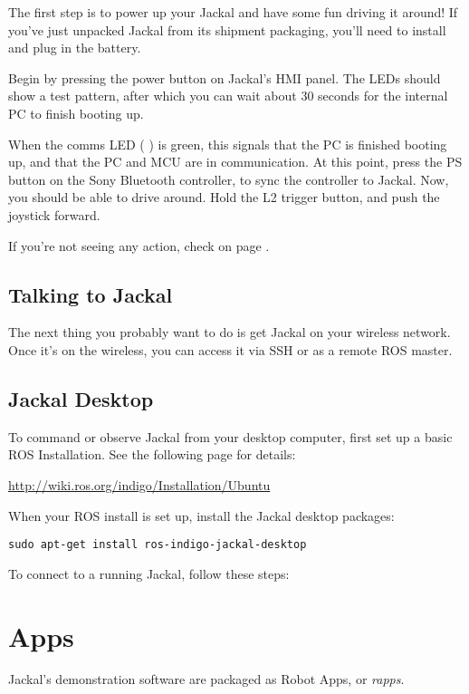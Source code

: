 \documentclass[]{clearpath-manual}
\begin{document}
The first step is to power up your Jackal and have some fun driving it around! If you've
just unpacked Jackal from its shipment packaging, you'll need to install and plug in the
battery.

Begin by pressing the power button on Jackal's HMI panel. The LEDs should show a test
pattern, after which you can wait about 30 seconds for the internal PC to finish booting
up.

When the comms LED ( \placeholder{0.35cm}{0.35cm} ) is green, this signals that the PC is
finished booting up, and that the PC and MCU are in communication. At this point, press
the PS button on the Sony Bluetooth controller, to sync the controller to Jackal. Now,
you should be able to drive around. Hold the L2 trigger button, and push the joystick
forward.

If you're not seeing any action, check  on page \pageref{trouble}.

\subsection{Talking to Jackal}

The next thing you probably want to do is get Jackal on your wireless network. Once it's
on the wireless, you can access it via SSH or as a remote ROS master.


\subsection{Jackal Desktop}

To command or observe Jackal from your desktop computer, first set up a basic
ROS Installation. See the following page for details:

\url{http://wiki.ros.org/indigo/Installation/Ubuntu}

When your ROS install is set up, install the Jackal desktop packages:

\begin{lstlisting}
sudo apt-get install ros-indigo-jackal-desktop
\end{lstlisting}

To connect to a running Jackal, follow these steps:


\section{Apps}

Jackal's demonstration software are packaged as Robot Apps, or \textit{rapps}.
\end{document}
